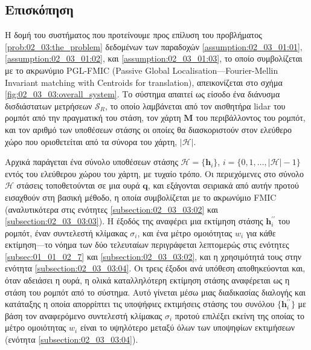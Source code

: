 \subsection{Επισκόπηση}
\label{subsection:02_03_03:01}

Η δομή του συστήματος που προτείνουμε προς επίλυση του προβλήματος
\ref{prob:02_03:the_problem} δεδομένων των παραδοχών
\ref{assumption:02_03_01:01}, \ref{assumption:02_03_01:02}, και
\ref{assumption:02_03_01:03}, το οποίο συμβολίζεται με το ακρωνύμιο PGL-FMIC
(Passive Global Localisation---Fourier-Mellin Invariant matching with Centroids
for translation), απεικονίζεται στο σχήμα \ref{fig:02_03_03:overall_system}. Το
σύστημα απαιτεί ως είσοδο ένα διάνυσμα δισδιάστατων μετρήσεων $\mathcal{S}_R$,
το οποίο λαμβάνεται από τον αισθητήρα lidar του ρομπότ από την πραγματική του
στάση, τον χάρτη $\bm{M}$ του περιβάλλοντος του ρομπότ, και
τον αριθμό των υποθέσεων στάσης οι οποίες θα διασκοριστούν στον ελεύθερο
χώρο που οριοθετείται από τα σύνορα του χάρτη, $|\mathcal{H}|$.

Αρχικά παράγεται ένα σύνολο υποθέσεων στάσης $\mathcal{H} = \{\bm{h}_i\}$, $i =
\{0, 1, \dots, |\mathcal{H}|-1\}$ εντός του ελεύθερου χώρου του χάρτη, με
τυχαίο τρόπο. Οι περιεχόμενες στο σύνολο $\mathcal{H}$ στάσεις τοποθετούνται σε
μια ουρά $\bm{q}$, και εξάγονται σειριακά από αυτήν προτού εισαχθούν στη βασική
μέθοδο, η οποία συμβολίζεται με το ακρωνύμιο FMIC (αναλυτικότερα στις ενότητες
\ref{subsection:02_03_03:02} και \ref{subsection:02_03_03:03}). Η έξοδός της
αναφέρει μια εκτίμηση στάσης $\bm{h}_i^{\prime\prime}$ του ρομπότ, έναν
συντελεστή κλίμακας $\sigma_i$, και ένα μέτρο ομοιότητας $w_i$ για κάθε
εκτίμηση---το νόημα των δύο τελευταίων περιγράφεται λεπτομερώς στις ενότητες
\ref{subsec:01_01_02_7} και \ref{subsection:02_03_03:02}, και η χρησιμότητά
τους στην ενότητα \ref{subsection:02_03_03:04}. Οι τρεις έξοδοι ανά υπόθεση
αποθηκεύονται και, όταν αδειάσει η ουρά, η ολικά καταλληλότερη εκτίμηση στάσης
αναφέρεται ως η στάση του ρομπότ από το σύστημα. Αυτό γίνεται μέσω μιας
διαδικασίας διαλογής και κατάταξης η οποία απορρίπτει τις υποψήφιες εκτιμήσεις
στάσης του συνόλου $\{\bm{h}_i^{\prime\prime}\}$ με βάση τον αναφερόμενο
συντελεστή κλίμακας $\sigma_i$ προτού επιλέξει εκείνη της οποίας το μέτρο
ομοιότητας $w_i$ είναι το υψηλότερο μεταξύ όλων των υποψηφίων εκτιμήσεων
(ενότητα \ref{subsection:02_03_03:04}).

